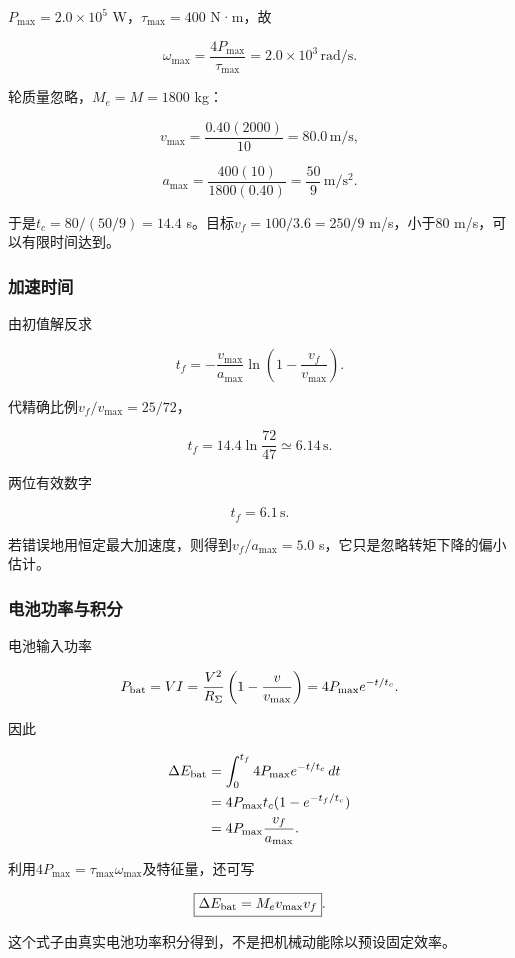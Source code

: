 \documentclass[12pt,a4paper,fontset=fandol]{ctexart}
\begin{document}
\(P_{\max}=2.0\times10^5\) W，\(\tau_{\max}=400\) N·m，故

\[
\omega_{\max}=\frac{4P_{\max}}{\tau_{\max}}
=2.0\times10^3\,\mathrm{rad/s}.
\]

轮质量忽略，\(M_e=M=1800\) kg：

\[
v_{\max}=\frac{0.40(2000)}{10}
=80.0\,\mathrm{m/s},
\]

\[
a_{\max}=\frac{400(10)}{1800(0.40)}
=\frac{50}{9}\,\mathrm{m/s^2}.
\]

于是\(t_c=80/(50/9)=14.4\) s。目标\(v_f=100/3.6=250/9\) m/s，小于80
m/s，可以有限时间达到。

\subsubsection{加速时间}\label{ux52a0ux901fux65f6ux95f4}

由初值解反求

\[
t_f=-\frac{v_{\max}}{a_{\max}}
\ln\left(1-\frac{v_f}{v_{\max}}\right).
\]

代精确比例\(v_f/v_{\max}=25/72\)，

\[
t_f=14.4\ln\frac{72}{47}\simeq6.14\,\mathrm s.
\]

两位有效数字

\[
\boxed{t_f=6.1\,\mathrm s}.
\]

若错误地用恒定最大加速度，则得到\(v_f/a_{\max}=5.0\)
s，它只是忽略转矩下降的偏小估计。

\subsubsection{电池功率与积分}\label{ux7535ux6c60ux529fux7387ux4e0eux79efux5206}

电池输入功率

\[
P_{\rm bat}=VI=\frac{V^2}{R_\Sigma}
\left(1-\frac v{v_{\max}}\right)
=4P_{\max}e^{-t/t_c}.
\]

因此

\[
\begin{aligned}
\Delta E_{\rm bat}
&=\int_0^{t_f}4P_{\max}e^{-t/t_c}\,dt\\
&=4P_{\max}t_c(1-e^{-t_f/t_c})\\
&=4P_{\max}\frac{v_f}{a_{\max}}.
\end{aligned}
\]

利用\(4P_{\max}=\tau_{\max}\omega_{\max}\)及特征量，还可写

\[
\boxed{\Delta E_{\rm bat}=M_ev_{\max}v_f}.
\]

这个式子由真实电池功率积分得到，不是把机械动能除以预设固定效率。
\end{document}
